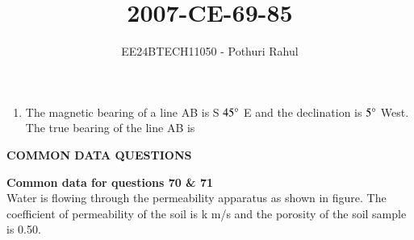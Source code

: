 \documentclass[journal]{IEEEtran}
\begin{document}

\vspace{3cm}
\title{2007-CE-69-85}
\author{EE24BTECH11050 - Pothuri Rahul}
{\let\newpage\relax\maketitle}
\renewcommand{\thefigure}{\theenumi}
\renewcommand{\thetable}{\theenumi}
\setlength{\intextsep}{10pt} %
\renewcommand{\thetable}{\theenumi}

\begin{enumerate}[start=69]


\item %
The magnetic bearing of a line AB is S $45\degree$ E and the declination is $5\degree$ West. The true bearing of the line AB is 
\begin{enumerate}
\end{enumerate}
\end{enumerate}

\begin{center}
    \textbf{COMMON DATA QUESTIONS}
\end{center}

\textbf{Common data for questions 70 \& 71 }\\
Water is flowing through the permeability apparatus as shown in figure. The coefficient of permeability of the soil is k m/s and the porosity of the soil sample is 0.50.
\end{document}
